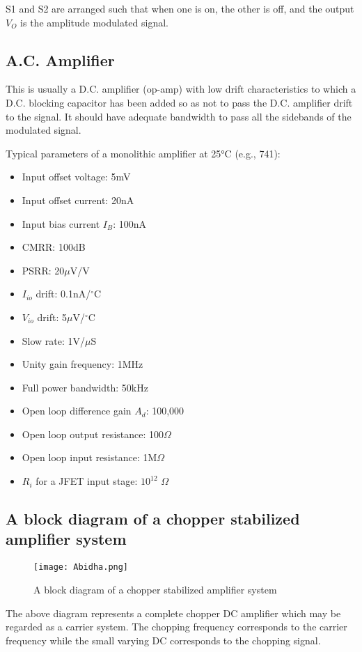 \documentclass[a4paper,9pt,twoside,openany,twocolumn]{memoir}
\begin{document}
S1 and S2 are arranged such that when one is on, the other is off, and the output $V_O$ is the amplitude modulated signal.

\subsection*{A.C. Amplifier}
This is usually a D.C. amplifier (op-amp) with low drift characteristics to which a D.C. blocking capacitor has been added so as not to pass the D.C. amplifier drift to the signal. It should have adequate bandwidth to pass all the sidebands of the modulated signal.

Typical parameters of a monolithic amplifier at 25°C (e.g., 741):
\begin{itemize}
    \item Input offset voltage: 5mV
    \item Input offset current: 20nA
    \item Input bias current $I_B$: 100nA
    \item CMRR: 100dB
    \item PSRR: 20$\mu$V/V
    \item $I_{io}$ drift: 0.1nA/$^\circ$C
    \item $V_{io}$ drift: 5$\mu$V/$^\circ$C
    \item Slow rate: 1V/$\mu$S
    \item Unity gain frequency: 1MHz
    \item Full power bandwidth: 50kHz
    \item Open loop difference gain $A_d$: 100,000
    \item Open loop output resistance: 100$\Omega$
    \item Open loop input resistance: 1M$\Omega$
    \item $R_i$ for a JFET input stage: $10^{12}$ $\Omega$
\end{itemize}
\subsection*{A block diagram of a chopper stabilized amplifier system}

\begin{figure}[h]
    \centering
    \texttt{[image: Abidha.png]}
    \caption{A block diagram of a chopper stabilized amplifier system}
\end{figure}

The above diagram represents a complete chopper DC amplifier which may be regarded as a carrier system. The chopping frequency corresponds to the carrier frequency while the small varying DC corresponds to the chopping signal.
\end{document}
